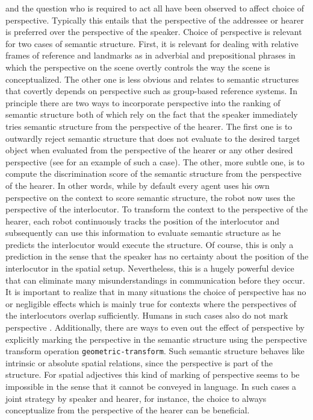 \begin{description}
and the question who is required to act \citep{tversky2009perspective}
all have been observed to affect choice of perspective. Typically this
entails that the perspective of the addressee or hearer is preferred over
the perspective of the speaker. Choice of perspective is relevant for 
two cases of semantic structure. First, it is relevant for  
dealing with relative frames of reference and landmarks as in adverbial
and prepositional phrases in which the perspective on the scene 
overtly controls the way the scene is conceptualized. 
The other one is less obvious and relates to semantic structures that 
covertly depends on perspective such as 
group-based reference systems. In principle there are two ways 
to incorporate perspective into the ranking of semantic structure both of 
which rely on the fact that the speaker immediately tries semantic
structure from the perspective of the hearer. The first one is to outwardly
reject semantic structure that does not evaluate to the desired 
target object when evaluated from the perspective of the hearer or any
other desired perspective (see  
for an example of such a case). 
The other, more subtle one, is to compute the discrimination score
of the semantic structure from the perspective of the hearer. In other words,
while by default every agent uses his own perspective on the context
to score semantic structure, the robot now uses the perspective of the interlocutor.
To transform the context to the perspective of the hearer, each robot
continuously tracks the position of the interlocutor and subsequently
can use this information to evaluate semantic structure as he
predicts the interlocutor would execute the structure. Of course,
this is only a prediction in the sense that the speaker has
no certainty about the position of the interlocutor in the spatial
setup. Nevertheless, this is a hugely powerful device that
can eliminate many misunderstandings in communication 
before they occur. It is important to realize that in many situations
the choice of perspective has no or negligible effects
which is mainly true for contexts where 
the perspectives of the interlocutors overlap sufficiently.
Humans in such cases also do not mark perspective 
\citep{tenbrink2005dimensional}.
Additionally, there are ways to even out the effect
of perspective by explicitly marking the perspective in the semantic
structure using the perspective transform operation
{\footnotesize\tt geometric-transform}. Such semantic structure
behaves like intrinsic or absolute spatial relations, since
the perspective is part of the structure. For spatial
adjectives this kind of marking of perspective
seems to be impossible in the sense that it cannot be conveyed
in language. In such cases a joint strategy by speaker
and hearer, for instance, the choice to always conceptualize from
the perspective of the hearer can be beneficial.


\end{description}
